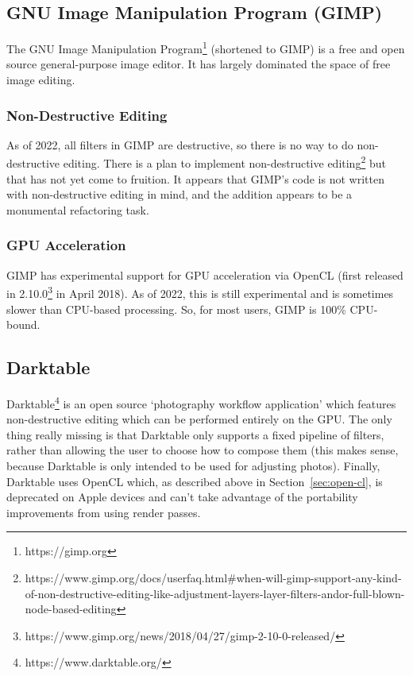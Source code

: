 \documentclass[12pt]{article}
\begin{document}
\subsection{GNU Image Manipulation Program (GIMP)}

The GNU Image Manipulation Program\footnote{https://gimp.org} (shortened to GIMP) is a free and open
source general-purpose image editor.  It has largely dominated the space of free image editing.

\subsubsection{Non-Destructive Editing}

As of 2022, all filters in GIMP are destructive, so there is no way to do non-destructive editing.
There is a plan to implement non-destructive
editing\footnote{https://www.gimp.org/docs/userfaq.html\#when-will-gimp-support-any-kind-of-non-destructive-editing-like-adjustment-layers-layer-filters-andor-full-blown-node-based-editing}
but that has not yet come to fruition.  It appears that GIMP's code is not written with
non-destructive editing in mind, and the addition appears to be a monumental refactoring task.

\subsubsection{GPU Acceleration}

GIMP has experimental support for GPU acceleration via OpenCL (first released in
2.10.0\footnote{https://www.gimp.org/news/2018/04/27/gimp-2-10-0-released/} in April 2018).  As of
2022, this is still experimental and is sometimes slower than CPU-based processing.  So, for most
users, GIMP is 100\% CPU-bound.

\subsection{Darktable}

Darktable\footnote{https://www.darktable.org/} is an open source `photography workflow application'
which features non-destructive editing which can be performed entirely on the GPU.  The only thing
really missing is that Darktable only supports a fixed pipeline of filters, rather than allowing the
user to choose how to compose them (this makes sense, because Darktable is only intended to be used
for adjusting photos).  Finally, Darktable uses OpenCL which, as described above in
Section~\ref{sec:open-cl}, is deprecated on Apple devices and can't take advantage of the
portability improvements from using render passes.
\end{document}
